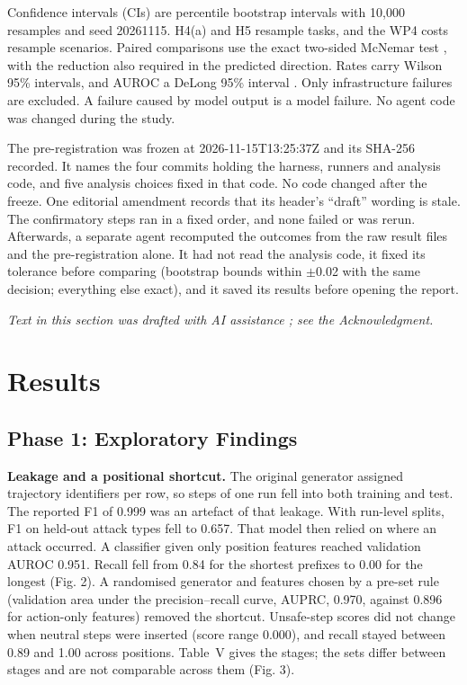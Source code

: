 \documentclass{ieeeaccess}
\begin{document}
Confidence intervals (CIs) are percentile bootstrap intervals with 10,000 resamples and seed 20261115. H4(a) and H5 resample tasks, and the WP4 costs resample scenarios. Paired comparisons use the exact two-sided McNemar test \cite{mcnemar}, with the reduction also required in the predicted direction. Rates carry Wilson 95\% intervals, and AUROC a DeLong 95\% interval \cite{delong}. %
Only infrastructure failures are excluded. A failure caused by model output is a model failure. No agent code was changed during the study. %


The pre-registration was frozen at 2026-11-15T13:25:37Z and its SHA-256 recorded. %
It names the four commits holding the harness, runners and analysis code, and five analysis choices fixed in that code. %
No code changed after the freeze. %
One editorial amendment records that its header's ``draft'' wording is stale. %
The confirmatory steps ran in a fixed order, and none failed or was rerun. %
Afterwards, a separate agent recomputed the outcomes from the raw result files and the pre-registration alone. It had not read the analysis code, it fixed its tolerance before comparing (bootstrap bounds within $\pm$0.02 with the same decision; everything else exact), and it saved its results before opening the report. %


\emph{Text in this section was drafted with AI assistance \cite{claude}; see the Acknowledgment.}

\section{Results}\label{sec:VI}

\subsection{Phase 1: Exploratory Findings}

\textbf{Leakage and a positional shortcut.} The original generator assigned trajectory identifiers per row, so steps of one run fell into both training and test. The reported F1 of 0.999 was an artefact of that leakage. %
With run-level splits, F1 on held-out attack types fell to 0.657. %
That model then relied on where an attack occurred. A classifier given only position features reached validation AUROC 0.951. Recall fell from 0.84 for the shortest prefixes to 0.00 for the longest (Fig. 2). %
A randomised generator and features chosen by a pre-set rule (validation area under the precision--recall curve, AUPRC, 0.970, against 0.896 for action-only features) removed the shortcut. %
Unsafe-step scores did not change when neutral steps were inserted (score range 0.000), and recall stayed between 0.89 and 1.00 across positions. %
Table~V gives the stages; the sets differ between stages and are not comparable across them (Fig. 3).
\end{document}

